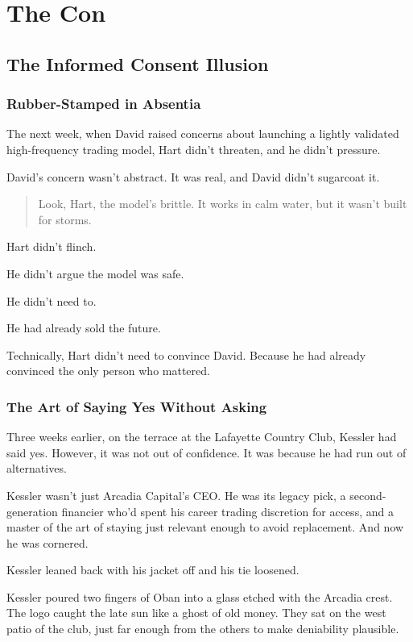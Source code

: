 \section{The Con}

\subsection{The Informed Consent Illusion}

\subsubsection{Rubber-Stamped in Absentia}

The next week, when David raised concerns about launching a lightly validated high-frequency trading model,  
Hart didn’t threaten, and he didn’t pressure.

David’s concern wasn’t abstract. It was real, and David didn’t sugarcoat it.

\begin{quote}
  Look, Hart, the model’s brittle. It works in calm water, but it wasn’t built for storms.
\end{quote}

Hart didn’t flinch.  

He didn’t argue the model was safe.  

He didn’t need to.  

He had already sold the future.

Technically, Hart didn’t need to convince David. Because he had already convinced the only person who mattered.

\subsubsection{The Art of Saying Yes Without Asking}

Three weeks earlier, on the terrace at the Lafayette Country Club,
Kessler had said yes. However, it was not out of confidence. It was because he had run out of alternatives.

Kessler wasn’t just Arcadia Capital’s CEO. 
He was its legacy pick, a second-generation financier who’d spent his career trading discretion for access, and a master 
of the art of staying just relevant enough to avoid replacement. And now he was cornered. 

Kessler leaned back with his jacket off and his tie loosened.

Kessler poured two fingers of Oban into a glass etched with the Arcadia crest. The logo caught the late sun like a ghost 
of old money.  They sat on the west patio of the club, 
just far enough from the others to make deniability plausible.

